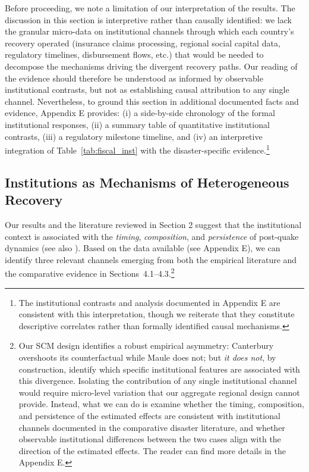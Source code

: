 \documentclass[12pt]{article}
\begin{document}
Before proceeding, we note a limitation of our interpretation of the results. The discussion in this section is interpretive rather than causally identified: we lack the granular micro-data on institutional channels through which each country's recovery operated (insurance claims processing, regional social capital data, regulatory timelines, disbursement flows, etc.) that would be needed to decompose the mechanisms driving the divergent recovery paths. Our reading of the evidence should therefore be understood as informed by observable institutional contrasts, but not as establishing causal attribution to any single channel. Nevertheless, to ground this section in additional documented facts and evidence, Appendix E provides: (i) a side-by-side chronology of the formal institutional responses, (ii) a summary table of quantitative institutional contrasts, (iii) a regulatory milestone timeline, and (iv) an interpretive integration of Table~\ref{tab:fiscal_inst} with the disaster-specific evidence.\footnote{The institutional contrasts and analysis documented in Appendix E are consistent with this interpretation, though we reiterate that they constitute descriptive correlates rather than formally identified causal mechanisms.}

\subsection{Institutions as Mechanisms of Heterogeneous Recovery}

Our results and the literature reviewed in Section 2 suggest that the institutional context is associated with the \emph{timing}, \emph{composition}, and \emph{persistence} of post-quake dynamics (see also \cite{barone2014natural, raschky2008institutions, noydupont2018longterm}). Based on the data available (see Appendix E), we can identify three relevant channels emerging from both the empirical literature and the comparative evidence in Sections~4.1–4.3.\footnote{Our SCM design identifies a robust empirical asymmetry: Canterbury overshoots its counterfactual while Maule does not; but \textit{it does not}, by construction, identify which specific institutional features are associated with this divergence. Isolating the contribution of any single institutional channel would require micro-level variation that our aggregate regional design cannot provide. Instead, what we can do is examine whether the timing, composition, and persistence of the estimated effects are consistent with institutional channels documented in the comparative disaster literature, and whether observable institutional differences between the two cases align with the direction of the estimated effects. The reader can find more details in the Appendix E.}
\end{document}
